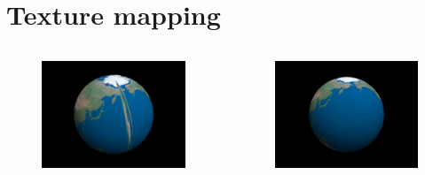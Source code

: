 \documentclass{beamer}
\begin{document}
\section{Texture mapping}
\begin{frame}
	\begin{columns}[T]
		\begin{column}{.45\textwidth}
			\begin{figure}
				\includegraphics[width=\textwidth]{screen_2015-03-25_12:02:27}
			\end{figure}
		\end{column}
		\begin{column}{.45\textwidth}
			\begin{figure}
				\includegraphics[width=\textwidth]{screen_2015-03-25_12:02:57}
			\end{figure}
		\end{column}
	\end{columns}
\end{frame}
\end{document}
